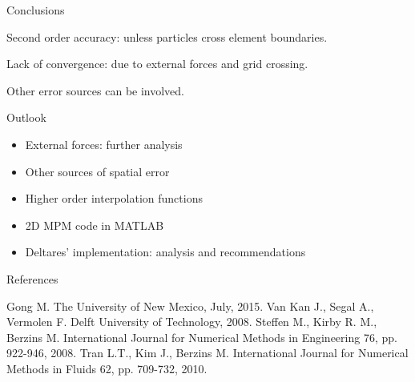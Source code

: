 \documentclass[mathserif,professionalfont,hyperref={pdfpagelabels=false}]{beamer}
\begin{document}
\begin{frame}{Conclusions}
\begin{tcolorbox}[colback=blue!5,colframe=blue!40!black,title=Vibrating bar]
Second order accuracy: unless particles  cross element boundaries.
\end{tcolorbox}
\pause
\begin{tcolorbox}[colback=blue!5,colframe=blue!40!black,title=Oedometer]
Lack of convergence: due to external forces and grid crossing.
\end{tcolorbox}
\pause
\begin{tcolorbox}[colback=blue!5,colframe=blue!40!black,title=Both problems]
Other error sources can be involved.
\end{tcolorbox}
\end{frame}

\begin{frame}{Outlook}
\begin{itemize}
\item External forces: further analysis 
\pause
\item Other sources of spatial error
\pause
\item Higher order interpolation functions
\pause
\item 2D MPM code in MATLAB
\pause
\item Deltares' implementation: analysis and recommendations
\end{itemize}
\end{frame}



\begin{frame}{References}
\begin{thebibliography}{22}
  Gong M.
 \newblock The University of New Mexico, July, 2015.
  Van Kan J., Segal A., Vermolen F. 
 \newblock Delft University of Technology, 2008.
  Steffen M., Kirby R. M., Berzins M. 
 \newblock International Journal for Numerical Methods in Engineering 76, pp. 922-946, 2008.
  Tran L.T., Kim J., Berzins M. 
 \newblock International Journal for Numerical Methods in Fluids 62, pp. 709-732, 2010.
\end{thebibliography}
\end{frame}
\end{document}

